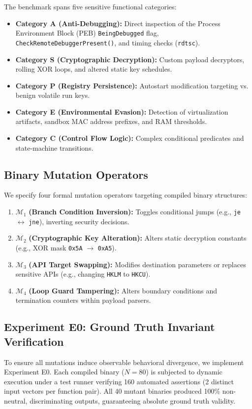 \documentclass[conference]{IEEEtran}
\begin{document}
The benchmark spans five sensitive functional categories:
\begin{itemize}
    \item \textbf{Category A (Anti-Debugging):} Direct inspection of the Process Environment Block (PEB) \texttt{BeingDebugged} flag, \texttt{CheckRemoteDebuggerPresent()}, and timing checks (\texttt{rdtsc}).
    \item \textbf{Category S (Cryptographic Decryption):} Custom payload decryptors, rolling XOR loops, and altered static key schedules.
    \item \textbf{Category P (Registry Persistence):} Autostart modification targeting  vs. benign volatile run keys.
    \item \textbf{Category E (Environmental Evasion):} Detection of virtualization artifacts, sandbox MAC address prefixes, and RAM thresholds.
    \item \textbf{Category C (Control Flow Logic):} Complex conditional predicates and state-machine transitions.
\end{itemize}

\subsection{Binary Mutation Operators}
We specify four formal mutation operators targeting compiled binary structures:
\begin{enumerate}
    \item $\mathcal{M}_1$ \textbf{(Branch Condition Inversion):} Toggles conditional jumps (e.g., \texttt{je} $\leftrightarrow$ \texttt{jne}), inverting security decisions.
    \item $\mathcal{M}_2$ \textbf{(Cryptographic Key Alteration):} Alters static decryption constants (e.g., XOR mask \texttt{0x5A} $\rightarrow$ \texttt{0xA5}).
    \item $\mathcal{M}_3$ \textbf{(API Target Swapping):} Modifies destination parameters or replaces sensitive APIs (e.g., changing \texttt{HKLM} to \texttt{HKCU}).
    \item $\mathcal{M}_4$ \textbf{(Loop Guard Tampering):} Alters boundary conditions and termination counters within payload parsers.
\end{enumerate}

\subsection{Experiment E0: Ground Truth Invariant Verification}
To ensure all mutations induce observable behavioral divergence, we implement Experiment E0. Each compiled binary ($N=80$) is subjected to dynamic execution under a test runner verifying 160 automated assertions (2 distinct input vectors per function pair). All 40 mutant binaries produced 100\% non-neutral, discriminating outputs, guaranteeing absolute ground truth validity.
\end{document}
